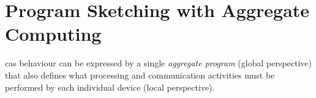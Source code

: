 \chapter{Program Sketching with Aggregate Computing}
\minitoc%
\begin{comment}
The pervasiveness of computing and networking
 fosters applications 
 backed by large-scale cyber-physical collectives---cf. edge-fog-cloud infrastructures, robot swarms, %
 and smart ecosystems.
%
Combined with the \emph{autonomic computing} vision ~\cite{DBLP:journals/computer/KephartC03}, which promotes autonomy and self-* capabilities in engineered systems,
 there is an increasing trend towards \acp{cas} and their engineering~\cite{DBLP:journals/sttt/NicolaJW20,DBLP:journals/tasm/BucchiaroneDPCS20}.
%
\acp{cas} are characterized 
 by a multitude of agents  
 that can produce globally coherent results (\emph{emergents}~\cite{DBLP:conf/atal/WolfH04}),
 and collective-level adaptivity to environment change
 via local decision-making and decentralized interaction.
%
The \emph{engineering of \acp{cas}} is an open research problem~\cite{DBLP:journals/sttt/NicolaJW20,DBLP:journals/corr/abs-1108-5643} of significance, tightly linked with the problems of ``steering'' self-organization and ``controlling'' emergence to promote desired while avoiding undesired emergents~\cite{DBLP:books/sp/08/Muller-SchloerS08}.
%
In general, when dealing with \acp{cas},
 there are two distinct problems:
 (i) given an initial system state and local behavioural rules, predicting what global outcomes will be produced (\emph{forward}, \emph{prediction}, or \emph{local-to-global problem});
 and
 (ii) what local behavioural rules must be assigned to the system devices to achieve certain global outcomes (\emph{inverse}, \emph{control}, or \emph{global-to-local problem}).
%
These two problems provide corresponding perspectives
 for \emph{designing} \acp{cas}.
% 
In particular, the latter perspective has promoted research on \emph{spatial} and \emph{macro-programming}~\cite{beal2013organizing-aggregate,DBLP:journals/corr/abs-2201-03473}
 aiming at expressing programs in terms of the desired global outcome
 and leaving the underlying platform to deal with the global-to-local mapping.

In this work,
 we consider \emph{\ac{ac}}~\cite{DBLP:journals/computer/BealPV15}, a prominent \emph{field-based coordination} approach~\cite{DBLP:journals/jlap/ViroliBDACP19} 
promoting macro-programming 
 by capturing \ac{cas} behaviours 
 as functions operating on \emph{computational fields}~\cite{DBLP:journals/jlap/ViroliBDACP19},
 in a system model of neighbour-interacting devices
 operating in asynchronous sense-compute-interact rounds.
%
A computational field is a macro-abstraction
 that maps a set of devices over time to computational values.
%
\ac{ac} is based on the \emph{\ac{fc}}~\cite{DBLP:journals/jlap/ViroliBDACP19}, or variants thereof,
 that define constructs for manipulating and evolving fields.
%
\end{comment}
\ac{cas} behaviour
 can be expressed by a single \emph{aggregate program} (global perspective)
 that also defines 
 what processing and communication activities
 must be performed by each individual device (local perspective).

